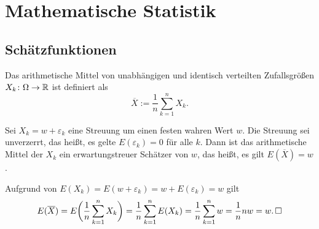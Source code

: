 \section{Mathematische Statistik}

\subsection{Schätzfunktionen}%

\begin{Definition}\newlinefirst
Das arithmetische Mittel von unabhängigen und identisch verteilten
Zufallsgrößen $X_k\colon\Omega\to\mathbb R$ ist definiert als
\[\textstyle\overline X := \frac{1}{n}\sum_{k=1}^n X_k.\]
\end{Definition}

\begin{Satz}
Sei $X_k = w+\varepsilon_k$ eine Streuung um einen festen wahren Wert
$w$. Die Streuung sei unverzerrt, das heißt, es gelte
$E(\varepsilon_k)=0$ für alle $k$. Dann ist das arithmetische Mittel
der $X_k$ ein erwartungstreuer Schätzer von $w$, das heißt, es gilt
$E(\overline X)=w$.
\end{Satz}
\begin{Beweis} Aufgrund von
$E(X_k) = E(w+\varepsilon_k) = w+E(\varepsilon_k) = w$ gilt
\[E(\overline X) = E\bigg(\frac{1}{n}\sum_{k=1}^n X_k\bigg)
= \frac{1}{n}\sum_{k=1}^n E(X_k) = \frac{1}{n}\sum_{k=1}^n w
= \frac{1}{n}nw = w.\,\square\]
\end{Beweis}
